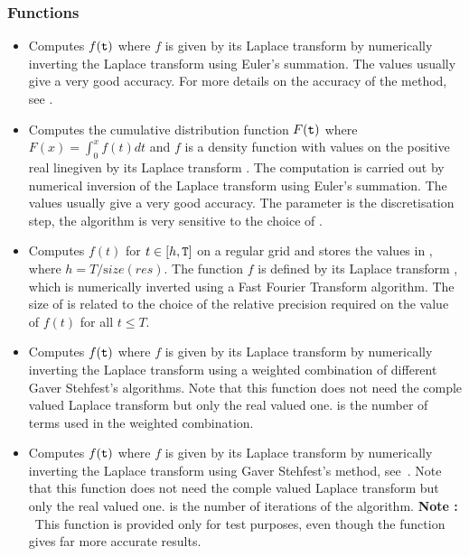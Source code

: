 \subsubsection{Functions}
\begin{itemize}
\item {}
  \sshortdescribe Computes $f({\tt t})$ where $f$ is given by its Laplace
  transform  by numerically inverting the Laplace transform using
  Euler's summation. The values  usually give a very good
  accuracy. For more details on the accuracy of the method, see \cite{aw, ll}. 

\item {}
  \sshortdescribe Computes the cumulative distribution function $F({\tt t})$
  where $F(x) = \int_0^x f(t) dt$ and $f$ is a density function with values on
  the positive real linegiven by its Laplace transform . The
  computation is carried out by numerical inversion of the Laplace transform
  using Euler's summation. The values  usually give a very
  good accuracy. The parameter  is the discretisation step, the
  algorithm is very sensitive to the choice of .

\item {}
  \sshortdescribe Computes $f(t)$ for $t \in [h, {\tt T}]$ on a regular grid
  and stores the values in , where $h = T / {\mathrm size}(res)$. The
  function $f$ is defined by its Laplace transform , which is
  numerically inverted using a Fast Fourier Transform algorithm. The size of
   is related to the choice of the relative precision 
  required on the value of $f(t)$ for all $t \le T$.

\item {}
  \sshortdescribe Computes $f({\tt t})$ where $f$ is given by its Laplace
  transform  by numerically inverting the Laplace transform using a
  weighted combination of different Gaver Stehfest's algorithms. Note that
  this function does not need the comple valued Laplace transform but only the
  real valued one.  is the number of terms used in the weighted combination.

\item {}
  \sshortdescribe Computes $f({\tt t})$ where $f$ is given by its Laplace
  transform  by numerically inverting the Laplace transform using
  Gaver Stehfest's method, see~\cite{aw}. Note that this function does not
  need the comple valued Laplace transform but only the real valued
  one.  is the number of iterations of the algorithm.
  {\bf Note : }~This function is provided only for test purposes, even though
  the function  gives far more accurate results.
\end{itemize}

